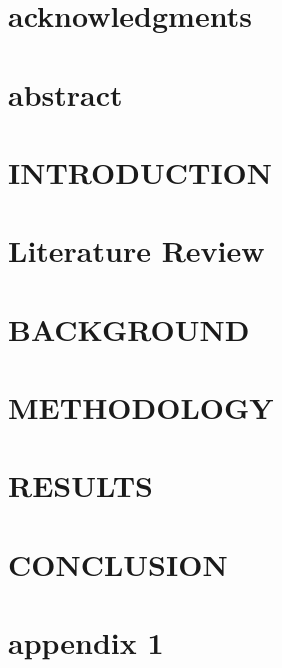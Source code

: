 \documentclass[12pt, twoside, openright]{report}
\begin{document}
	
	
	
	
	\chapter*{acknowledgments}
	
	\newpage
	
	\chapter*{abstract}
	
	
	
	\tableofcontents
	\listoffigures
	
	
	
	\chapter{INTRODUCTION}
	
	
	\chapter{Literature Review}
	
	
	\chapter{BACKGROUND}
	
	
	\chapter{METHODOLOGY}
	
	
	\chapter{RESULTS}
	
	
	\chapter{CONCLUSION}
	
	
	\appendix
	\chapter{appendix 1}
	
	
\end{document}
